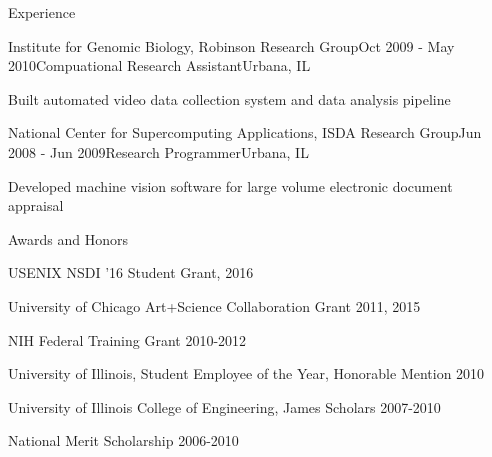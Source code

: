 \documentclass{resume} %
\begin{document}
\begin{rSection}{Experience}

\begin{rSubsection}{Institute for Genomic Biology, Robinson Research Group}{Oct 2009 - May 2010}{Compuational Research Assistant}{Urbana, IL}
\item Built automated video data collection system and data analysis pipeline

\end{rSubsection}


\begin{rSubsection}{National Center for Supercomputing Applications, ISDA Research Group}{Jun 2008 - Jun 2009}{Research Programmer}{Urbana, IL}
\item Developed machine vision software for large volume electronic document appraisal

\end{rSubsection}




\end{rSection}


\begin{rSection}{Awards and Honors}
	
	\item USENIX NSDI '16 Student Grant, 2016
	\item University of Chicago Art+Science Collaboration Grant 2011, 2015
	\item NIH Federal Training Grant 2010-2012
	\item University of Illinois, Student Employee of the Year, Honorable Mention 2010
	\item University of Illinois College of Engineering, James Scholars 2007-2010
	\item National Merit Scholarship 2006-2010
	
\end{rSection}


\end{document}
